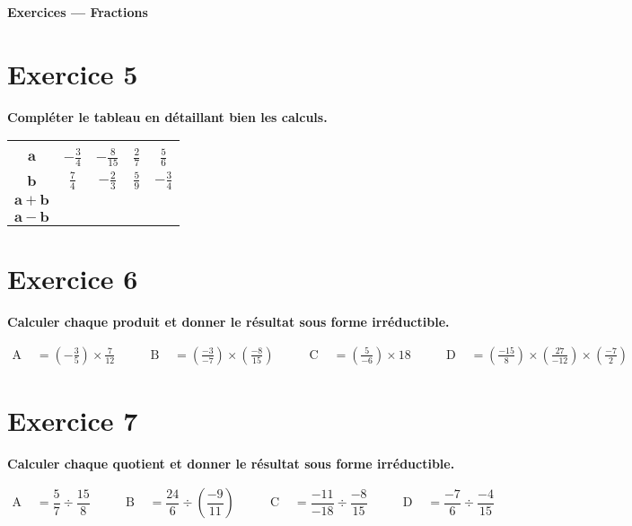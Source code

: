 \documentclass[a4paper,11pt]{article}
\begin{document}
\bigskip
{\Large \textbf{Exercices — Fractions}}\par\medskip


\section*{Exercice 5}
\textbf{Compléter le tableau en détaillant bien les calculs.}

\medskip
\renewcommand{\arraystretch}{1.4}
\begin{tabular}{|c|c|c|c|c|}
\hline
 &  &  &  &  \\
\(\mathbf{a}\) & \(\displaystyle -\frac{3}{4}\) & \(\displaystyle -\frac{8}{15}\) & \(\displaystyle \frac{2}{7}\) & \(\displaystyle \frac{5}{6}\)\\
\hline
\(\mathbf{b}\) & \(\displaystyle \frac{7}{4}\) & \(\displaystyle -\frac{2}{3}\) & \(\displaystyle \frac{5}{9}\) & \(\displaystyle -\frac{3}{4}\)\\
\hline
\(\mathbf{a+b}\) &  &  &  &  \\
\hline
\(\mathbf{a-b}\) &  &  &  &  \\
\hline
\end{tabular}


\section*{Exercice 6}
\textbf{Calculer chaque produit et donner le résultat sous forme irréductible.}

\[
\begin{aligned}
\text{A }&= \left(-\frac{3}{5}\right)\times\frac{7}{12}
&\qquad
\text{B }&= \left(\frac{-3}{-7}\right)\times\left(\frac{-8}{15}\right)
&\qquad
\text{C }&= \left(\frac{5}{-6}\right)\times 18
&\qquad
\text{D }&= \left(\frac{-15}{8}\right)\times\left(\frac{27}{-12}\right)\times\left(\frac{-7}{2}\right)
\end{aligned}
\]


\section*{Exercice 7}
\textbf{Calculer chaque quotient et donner le résultat sous forme irréductible.}

\[
\begin{aligned}
\text{A }&= \dfrac{5}{7}\div\dfrac{15}{8}
&\qquad
\text{B }&= \dfrac{24}{6}\div\left(\dfrac{-9}{11}\right)
&\qquad
\text{C }&= \dfrac{-11}{-18}\div\dfrac{-8}{15}
&\qquad
\text{D }&= \dfrac{-7}{6}\div\dfrac{-4}{15}
\end{aligned}
\]
\end{document}
